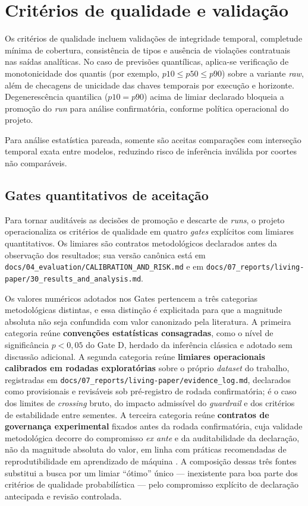 \section{Critérios de qualidade e validação}
Os critérios de qualidade incluem validações de integridade temporal, completude mínima de cobertura, consistência de tipos e ausência de violações contratuais nas saídas analíticas. No caso de previsões quantílicas, aplica-se verificação de monotonicidade dos quantis (por exemplo, \(p10 \leq p50 \leq p90\)) sobre a variante \textit{raw}, além de checagens de unicidade das chaves temporais por execução e horizonte. Degenerescência quantilica (\(p10 = p90\)) acima de limiar declarado bloqueia a promoção do \textit{run} para análise confirmatória, conforme política operacional do projeto.

Para análise estatística pareada, somente são aceitas comparações com interseção temporal exata entre modelos, reduzindo risco de inferência inválida por coortes não comparáveis.

\subsection{Gates quantitativos de aceitação}
Para tornar auditáveis as decisões de promoção e descarte de \textit{runs}, o projeto operacionaliza os critérios de qualidade em quatro \textit{gates} explícitos com limiares quantitativos. Os limiares são contratos metodológicos declarados antes da observação dos resultados; sua versão canônica está em \texttt{docs/04\_evaluation/CALIBRATION\_AND\_RISK.md} e em \texttt{docs/07\_reports/living-paper/30\_results\_and\_analysis.md}.

Os valores numéricos adotados nos Gates pertencem a três categorias metodológicas distintas, e essa distinção é explicitada para que a magnitude absoluta não seja confundida com valor canonizado pela literatura. A primeira categoria reúne \textbf{convenções estatísticas consagradas}, como o nível de significância \(p < 0{,}05\) do Gate D, herdado da inferência clássica e adotado sem discussão adicional. A segunda categoria reúne \textbf{limiares operacionais calibrados em rodadas exploratórias} sobre o próprio \textit{dataset} do trabalho, registradas em \texttt{docs/07\_reports/living-paper/evidence\_log.md}, declarados como provisionais e revisáveis sob pré-registro de rodada confirmatória; é o caso dos limites de \textit{crossing} bruto, do impacto admissível do \textit{guardrail} e dos critérios de estabilidade entre sementes. A terceira categoria reúne \textbf{contratos de governança experimental} fixados antes da rodada confirmatória, cuja validade metodológica decorre do compromisso \textit{ex ante} e da auditabilidade da declaração, não da magnitude absoluta do valor, em linha com práticas recomendadas de reprodutibilidade em aprendizado de máquina \cite{PINEAU2021REPRODUCIBILITY}. A composição dessas três fontes substitui a busca por um limiar ``ótimo'' único — inexistente para boa parte dos critérios de qualidade probabilística — pelo compromisso explícito de declaração antecipada e revisão controlada.

